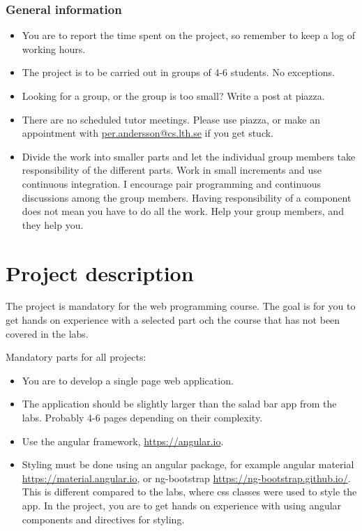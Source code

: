 \documentclass[fleqn, article, a4paper]{memoir}
\begin{document}
\maketitle
\thispagestyle{titlepage}
\vspace{-4cm}

\subsubsection*{General information}

\begin{itemize}\firmlist
\item You are to report the time spent on the project, so remember to keep a log of working hours.
\item The project is to be carried out in groups of 4-6 students. No exceptions.
\item Looking for a group, or the group is too small? Write a post at piazza.
\item There are no scheduled tutor meetings. Please use piazza, or make an appointment with \url{per.andersson@cs.lth.se} if you get stuck.
\item Divide the work into smaller parts and let the individual group members take responsibility of the different parts. Work in small increments and use continuous integration. I encourage pair programming and continuous discussions among the group members. Having responsibility of a component does not mean you have to do all the work. Help your group members, and they help you.
\end{itemize}

\section*{Project description}
\n The project is mandatory for the web programming course. The goal is for you to get hands on experience with a selected part och the course that has not been covered in the labs.

\noindent Mandatory parts for all projects:
\begin{itemize}\firmlist
\item You are to develop a single page web application.
\item The application should be slightly larger than the salad bar app from the labs. Probably 4-6 pages depending on their complexity.
\item Use the angular framework, \url{https://angular.io}.
\item Styling must be done using an angular package, for example angular material \url{https://material.angular.io}, or ng-bootstrap \url{https://ng-bootstrap.github.io/}. This is different compared to the labs, where css classes were used to style the app. In the project, you are to get hands on experience with using angular components and directives for styling.
\end{itemize}
\end{document}
